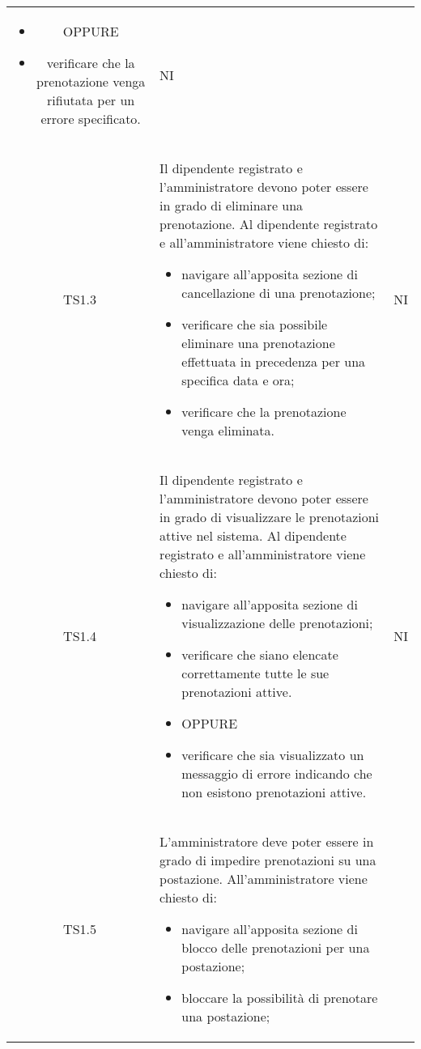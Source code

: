 {\begin{longtable}{ c C{11cm} c }
\begin{itemize}
            \item [] OPPURE
            \item verificare che la prenotazione venga rifiutata per un errore specificato.
        \end{itemize}&
        NI\\
        TS1.3&
        Il dipendente registrato e l'amministratore devono poter essere in grado di eliminare una prenotazione.\newline
        Al dipendente registrato e all'amministratore viene chiesto di:
        \begin{itemize}
            \item navigare all'apposita sezione di cancellazione di una prenotazione;
            \item verificare che sia possibile eliminare una prenotazione effettuata in precedenza per una specifica data e ora;
            \item verificare che la prenotazione venga eliminata.
        \end{itemize}&
        NI\\
        TS1.4&
        Il dipendente registrato e l'amministratore devono poter essere in grado di visualizzare le prenotazioni attive nel sistema.\newline
        Al dipendente registrato e all'amministratore viene chiesto di:
        \begin{itemize}
            \item navigare all'apposita sezione di visualizzazione delle prenotazioni;
            \item verificare che siano elencate correttamente tutte le sue prenotazioni attive.
            \item [] OPPURE
            \item verificare che sia visualizzato un messaggio di errore indicando che non esistono prenotazioni attive.
        \end{itemize}&
        NI\\
        TS1.5&
        L'amministratore deve poter essere in grado di impedire prenotazioni su una postazione.\newline
        All'amministratore viene chiesto di:
        \begin{itemize}
            \item navigare all'apposita sezione di blocco delle prenotazioni per una postazione;
            \item bloccare la possibilità di prenotare una postazione;

\end{itemize}
\end{longtable}}
